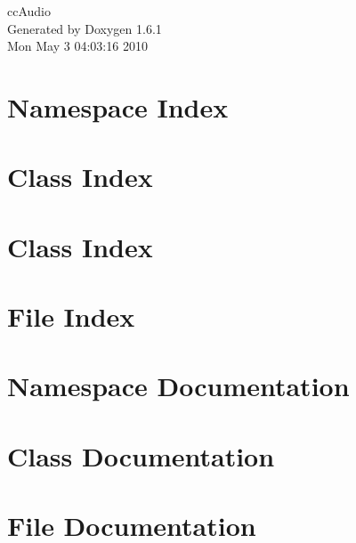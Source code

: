 \documentclass[a4paper]{book}
\begin{document}
\begin{titlepage}
\vspace*{7cm}
\begin{center}
{\Large ccAudio }\\
\vspace*{1cm}
{\large Generated by Doxygen 1.6.1}\\
\vspace*{0.5cm}
{\small Mon May 3 04:03:16 2010}\\
\end{center}
\end{titlepage}
\clearemptydoublepage
{}
\tableofcontents
\clearemptydoublepage
{}
\chapter{Namespace Index}

\chapter{Class Index}

\chapter{Class Index}

\chapter{File Index}

\chapter{Namespace Documentation}

\chapter{Class Documentation}





















\chapter{File Documentation}

\printindex
\end{document}
